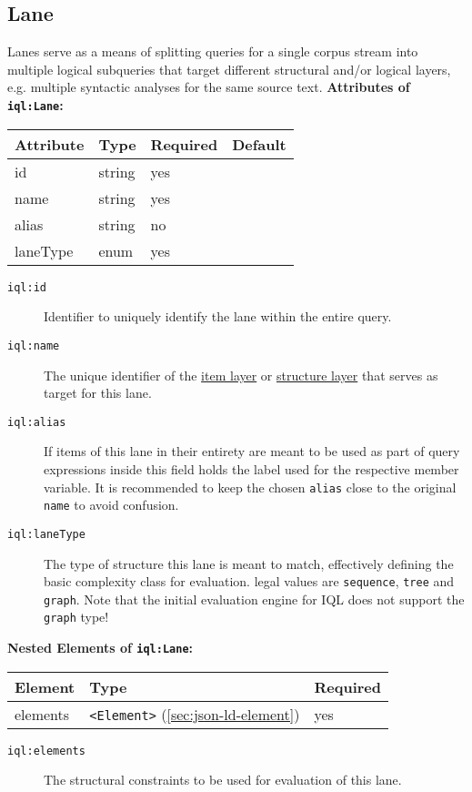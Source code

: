 \documentclass[11pt]{article}
\newcommand{\iql}{IQL\xspace}
\newcommand{\iqlns}{iql:}
\newcommand{\repoUrl}{https://github.com/ICARUS-tooling/icarus2-modeling-framework/blob/dev/}
\newcommand{\modelsUrl}{\repoUrl icarus2-model-api/src/main/java/de/ims/icarus2/model/api/}
\newcommand{\repoLink}[2]{\href{#1}{#2}}
\newcommand{\iqlType}[1]{\texttt{\iqlns#1}}
\newcommand{\iqlBaseType}[1]{\texttt{\textless#1\textgreater}}
\newcommand{\desc}[1]{\noindent#1\newline\medskip}
\newenvironment{attributes}[1]{
\noindent\textbf{Attributes of #1:}\newline\medskip
\begin{tabular}{|p{0.3\textwidth}|p{0.20\textwidth}|p{0.20\textwidth}|p{0.17\textwidth}|}
	\hline
	\textbf{Attribute} & \textbf{Type} & \textbf{Required} & \textbf{Default} \\ 
	\hline
	\hline
}{
\end{tabular}
}
\newcommand{\attribute}[4]{
	#1 & #2 & #3 & #4 \\
	\hline
}
\newenvironment{elements}[1]{
\noindent\textbf{Nested Elements of #1:}\newline\medskip
\begin{tabular}{|p{0.3\textwidth}|p{0.42\textwidth}|p{0.17\textwidth}|}
	\hline
	\textbf{Element} & \textbf{Type} & \textbf{Required} \\ 
	\hline
	\hline
}{
\end{tabular}
}
\newcommand{\element}[3]{
#1 & #2 & #3 \\
\hline
}
\begin{document}
\subsection{Lane}
\label{sec:json-ld-lane}
\desc{Lanes serve as a means of splitting queries for a single corpus stream into multiple logical subqueries that target different structural and/or logical layers, e.g. multiple syntactic analyses for the same source text.}
\begin{attributes}{\iqlType{Lane}}
	\attribute{id}{string}{yes}{}
	\attribute{name}{string}{yes}{}
	\attribute{alias}{string}{no}{}
	\attribute{laneType}{enum}{yes}{}
\end{attributes}
\begin{description}
	\item[\iqlType{id}] Identifier to uniquely identify the lane within the entire query.
	\item[\iqlType{name}] The unique identifier of the \repoLink{\modelsUrl layer/ItemLayer.java}{item layer} or \repoLink{\modelsUrl layer/StructureLayer.java}{structure layer} that serves as target for this lane.
	\item[\iqlType{alias}] If items of this lane in their entirety are meant to be used as part of query expressions inside this field holds the label used for the respective member variable. It is recommended to keep the chosen \texttt{alias} close to the original \texttt{name} to avoid confusion.
	\item[\iqlType{laneType}] The type of structure this lane is meant to match, effectively defining the basic complexity class for evaluation. legal values are \texttt{sequence}, \texttt{tree} and \texttt{graph}. Note that the initial evaluation engine for \iql does not support the \texttt{graph} type! %
\end{description}
\begin{elements}{\iqlType{Lane}}
	\element{elements}{\iqlBaseType{Element} (\ref{sec:json-ld-element})}{yes}
\end{elements}
\begin{description}
	\item[\iqlType{elements}] The structural constraints to be used for evaluation of this lane.
\end{description}
\end{document}
